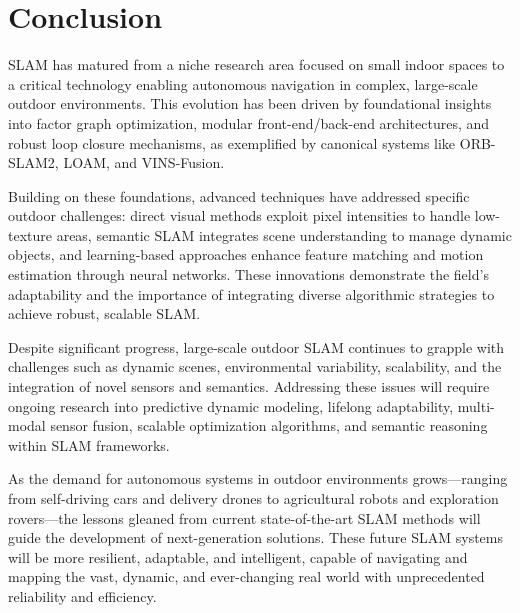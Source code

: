 \documentclass[conference]{IEEEtran}
\begin{document}
\section{Conclusion}
SLAM has matured from a niche research area focused on small indoor spaces to a critical technology enabling autonomous navigation in complex, large-scale outdoor environments. This evolution has been driven by foundational insights into factor graph optimization, modular front-end/back-end architectures, and robust loop closure mechanisms, as exemplified by canonical systems like ORB-SLAM2, LOAM, and VINS-Fusion.

Building on these foundations, advanced techniques have addressed specific outdoor challenges: direct visual methods exploit pixel intensities to handle low-texture areas, semantic SLAM integrates scene understanding to manage dynamic objects, and learning-based approaches enhance feature matching and motion estimation through neural networks. These innovations demonstrate the field’s adaptability and the importance of integrating diverse algorithmic strategies to achieve robust, scalable SLAM.

Despite significant progress, large-scale outdoor SLAM continues to grapple with challenges such as dynamic scenes, environmental variability, scalability, and the integration of novel sensors and semantics. Addressing these issues will require ongoing research into predictive dynamic modeling, lifelong adaptability, multi-modal sensor fusion, scalable optimization algorithms, and semantic reasoning within SLAM frameworks.

As the demand for autonomous systems in outdoor environments grows—ranging from self-driving cars and delivery drones to agricultural robots and exploration rovers—the lessons gleaned from current state-of-the-art SLAM methods will guide the development of next-generation solutions. These future SLAM systems will be more resilient, adaptable, and intelligent, capable of navigating and mapping the vast, dynamic, and ever-changing real world with unprecedented reliability and efficiency.
\end{document}
